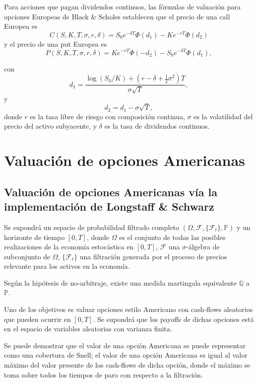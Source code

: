 \documentclass[12pt,reqno,letter]{article}
\begin{document}
	Para acciones que pagan dividendos continuos, las fórmulas de valuación
	para opciones Europeas de Black \& Scholes establecen que el precio de
	una call Europea es
	\[C(S,K,T,\sigma,r,\delta) = S_0e^{-\delta T}\Phi(d_1) - Ke^{-rT}\Phi(d_2)\]
	y el precio de una put Europea es
	\[P(S,K,T,\sigma,r,\delta) = Ke^{-rT}\Phi(-d_2) - S_0e^{-\delta T}\Phi(d_1),\]
	
	con
	\[d_1 = \frac{\log(S_0/K) + (r-\delta+\frac{1}{2}\sigma^2)T}{\sigma\sqrt{T}},\]
	y \[d_2 = d_1 - \sigma\sqrt{T},\] donde \(r\) es la tasa libre de riesgo
	con composición continua, \(\sigma\) es la volatilidad del precio del
	activo subyacente, y \(\delta\) es la tasa de dividendos continuos.
	
	\section{Valuación de opciones
		Americanas}\label{valuacion-de-opciones-americanas}
	
	\subsection{Valuación de opciones Americanas vía la implementación de
		Longstaff \&
		Schwarz}\label{valuacion-de-opciones-americanas-via-la-implementacion-de-longstaff-schwarz}
	
	Se supondrá un espacio de probabilidad filtrado completo
	\((\Omega, \mathcal{F}, \{\mathcal{F}_t\},\mathbb{P})\) y un horizonte
	de tiempo \([0,T]\), donde \(\Omega\) es el conjunto de todas las
	posibles realizaciones de la economía estocástica en \([0,T]\),
	\(\mathcal{F}\) una \(\sigma\)-álgebra de subconjunto de \(\Omega\),
	\(\{\mathcal{F}_t\}\) una filtración generada por el proceso de precios
	relevante para los activos en la economía.
	
	Según la hipótesis de no-arbitraje, existe una medida martingala
	equivalente \(\mathbb{Q}\) a \(\mathbb{P}\).
	
	Uno de los objetivos es valuar opciones estilo Americano con cash-flows
	aleatorios que pueden ocurrir en \([0,T]\). Se supondrá que los payoffs
	de dichas opciones está en el espacio de variables aleatorias con
	varianza finita.
	
	Se puede demostrar que el valor de una opción Americana se puede
	representar como una cobertura de Snell; el valor de una opción
	Americana es igual al valor máximo del valor presente de los cash-flows
	de dicha opción, donde el máximo se toma sobre todos los tiempos de paro
	con respecto a la filtración.
	
\end{document}

